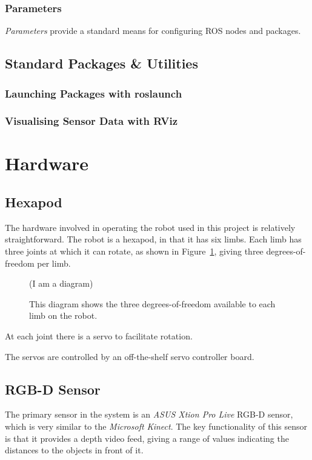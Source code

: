 \documentclass{l4proj}
\begin{document}
\subsubsection{Parameters}
\emph{Parameters} provide a standard means for configuring ROS nodes and packages.

\subsection{Standard Packages \& Utilities}
\subsubsection{Launching Packages with roslaunch}
\subsubsection{Visualising Sensor Data with RViz}


\section{Hardware}
\subsection{Hexapod}
The hardware involved in operating the robot used in this project is relatively straightforward. The robot is a hexapod, in that it has six limbs. Each limb has three joints at which it can rotate, as shown in Figure~\ref{fig:hexapod_dof}, giving three degrees-of-freedom per limb. 

\begin{figure}[!h]
    \centering
    (I am a diagram)
    \caption{This diagram shows the three degrees-of-freedom available to each limb on the robot.}
    \label{fig:hexapod_dof}
\end{figure}

At each joint there is a servo to facilitate rotation.

The servos are controlled by an off-the-shelf servo controller board. 

\subsection{RGB-D Sensor}
The primary sensor in the system is an \emph{ASUS Xtion Pro Live} RGB-D sensor, which is very similar to the \emph{Microsoft Kinect}. The key functionality of this sensor is that it provides a depth video feed, giving a range of values indicating the distances to the objects in front of it.
\end{document}
